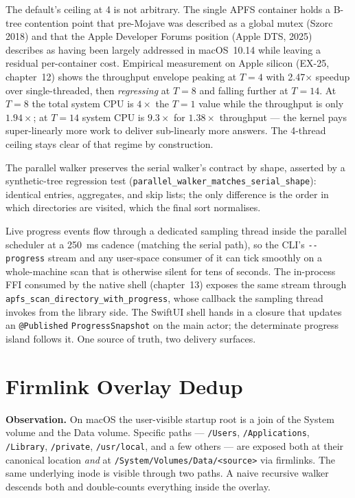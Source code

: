 The default's ceiling at 4 is not arbitrary. The single APFS
container holds a B-tree contention point that pre-Mojave was
described as a global mutex (Szorc 2018) and that the Apple
Developer Forums position (Apple DTS, 2025) describes as having
been largely addressed in macOS~10.14 while leaving a residual
per-container cost. Empirical measurement on Apple silicon
(EX-25, chapter~12) shows the throughput envelope peaking at
$T = 4$ with 2.47$\times$ speedup over single-threaded, then
\emph{regressing} at $T = 8$ and falling further at $T = 14$. At
$T = 8$ the total system CPU is $4\times$ the $T = 1$ value while
the throughput is only $1.94\times$; at $T = 14$ system CPU is
$9.3\times$ for $1.38\times$ throughput --- the kernel pays
super-linearly more work to deliver sub-linearly more answers.
The 4-thread ceiling stays clear of that regime by construction.

The parallel walker preserves the serial walker's contract by
shape, asserted by a synthetic-tree regression test
(\texttt{parallel\_walker\_matches\_serial\_shape}): identical
entries, aggregates, and skip lists; the only difference is the
order in which directories are visited, which the final sort
normalises.

Live progress events flow through a dedicated sampling thread
inside the parallel scheduler at a 250~ms cadence (matching the
serial path), so the CLI's \texttt{-{}-progress} stream and any
user-space consumer of it can tick smoothly on a whole-machine
scan that is otherwise silent for tens of seconds. The in-process
FFI consumed by the native shell (chapter~13) exposes the same
stream through \texttt{apfs\_scan\_directory\_with\_progress},
whose callback the sampling thread invokes from the library side.
The SwiftUI shell hands in a closure that updates an
\texttt{@Published} \texttt{ProgressSnapshot} on the main actor;
the determinate progress island follows it. One source of truth,
two delivery surfaces.

\section{Firmlink Overlay Dedup}

\textbf{Observation.} On macOS the user-visible startup root is a
join of the System volume and the Data volume. Specific paths ---
\texttt{/Users}, \texttt{/Applications}, \texttt{/Library},
\texttt{/private}, \texttt{/usr/local}, and a few others --- are
exposed both at their canonical location \emph{and} at
\texttt{/System/Volumes/Data/<source>} via firmlinks. The same
underlying inode is visible through two paths. A naive recursive
walker descends both and double-counts everything inside the
overlay.

